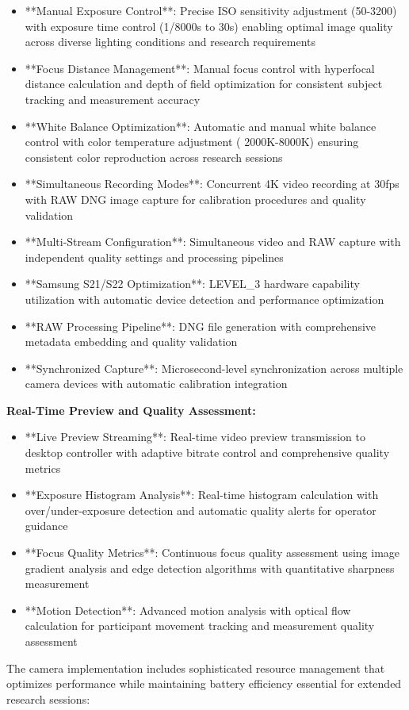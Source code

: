 \documentclass[12pt,a4paper]{article}
\begin{document}
\begin{itemize}
\item **Manual Exposure Control**: Precise ISO sensitivity adjustment (50-3200) with exposure time control (1/8000s to 30s)
  enabling optimal image quality across diverse lighting conditions and research requirements
\item **Focus Distance Management**: Manual focus control with hyperfocal distance calculation and depth of field
  optimization for consistent subject tracking and measurement accuracy
\item **White Balance Optimization**: Automatic and manual white balance control with color temperature adjustment (
  2000K-8000K) ensuring consistent color reproduction across research sessions
\item **Simultaneous Recording Modes**: Concurrent 4K video recording at 30fps with RAW DNG image capture for calibration
  procedures and quality validation
\item **Multi-Stream Configuration**: Simultaneous video and RAW capture with independent quality settings and processing
  pipelines
\item **Samsung S21/S22 Optimization**: LEVEL_3 hardware capability utilization with automatic device detection and
  performance optimization
\item **RAW Processing Pipeline**: DNG file generation with comprehensive metadata embedding and quality validation
\item **Synchronized Capture**: Microsecond-level synchronization across multiple camera devices with automatic calibration
  integration

\end{itemize}
\textbf{Real-Time Preview and Quality Assessment:}

\begin{itemize}
\item **Live Preview Streaming**: Real-time video preview transmission to desktop controller with adaptive bitrate control
  and comprehensive quality metrics
\item **Exposure Histogram Analysis**: Real-time histogram calculation with over/under-exposure detection and automatic
  quality alerts for operator guidance
\item **Focus Quality Metrics**: Continuous focus quality assessment using image gradient analysis and edge detection
  algorithms with quantitative sharpness measurement
\item **Motion Detection**: Advanced motion analysis with optical flow calculation for participant movement tracking and
  measurement quality assessment

\end{itemize}
The camera implementation includes sophisticated resource management that optimizes performance while maintaining
battery efficiency essential for extended research sessions:
\end{document}
